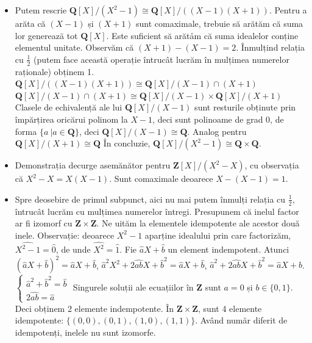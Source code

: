 \documentclass{article}
\begin{document}
\begin{itemize}
    \item Putem rescrie $\mathbf{Q}[X]/(X^2-1) \cong \mathbf{Q}[X]/((X-1)(X+1)).$ Pentru a arăta că $(X - 1)$ și $(X + 1)$ sunt comaximale, trebuie să arătăm că suma lor genereazä tot $\mathbf{Q}[X]$. Este suficient să arătåm că suma idealelor conține elementul unitate. \newline \newline
Observăm că $(X + 1) - (X - 1) = 2$. Înmulțind relația cu $\frac{1}{2}$ (putem face această operație întrucât lucrăm în mulțimea numerelor raționale) obținem 1. \newline \newline
$\mathbf{Q}[X]/((X-1)(X+1)) \cong \mathbf{Q}[X]/(X-1)\cap (X+1)$ \newline
$\mathbf{Q}[X]/(X-1)\cap (X+1) \cong \mathbf{Q}[X]/(X-1)\times \mathbf{Q}[X]/(X+1)$ \newline \newline
Clasele de echivalență ale lui $\mathbf{Q}[X]/(X-1)$ sunt resturile obținute prin împărțirea oricărui polinom la $X-1$, deci sunt polinoame de grad 0, de forma $\{a \ | a \in \mathbf{Q} \}$, deci $\mathbf{Q}[X]/(X-1)\cong \mathbf{Q}$. Analog pentru $\mathbf{Q}[X]/(X+1)\cong \mathbf{Q}$ \newline \newline
În concluzie, $\mathbf{Q}[X]/(X^2-1) \cong \mathbf{Q} \times \mathbf{Q}.$
\item Demonstrația decurge asemănător pentru $\mathbf{Z}[X]/(X^2-X)$, cu observația că $X^2-X = X(X-1)$. Sunt comaximale deoarece $X - (X-1) = 1$.
\item Spre deosebire de primul subpunct, aici nu mai putem înmulți relația cu $\frac{1}{2}$, întrucât lucrăm cu mulțimea numerelor întregi. \newline
Presupunem că inelul factor ar fi izomorf cu $\mathbf{Z} \times \mathbf{Z}$. Ne uităm la elementele idempotente ale acestor două inele.\newline
Observație: deoarece $X^2-1$ aparține idealului prin care factorizăm,
 $\widehat{X^2-1} = \widehat{0}$, de unde $\widehat{X^2} = \widehat{1}$. \newline
 Fie $\widehat{a}X + \widehat{b}$ un element indempotent. \newline
 Atunci $(\widehat{a}X + \widehat{b})^2 = \widehat{a}X + \widehat{b}$,  $\widehat{a}^2 X^2 + 2\widehat{ab}X + \widehat{b}^2 = \widehat{a}X + \widehat{b}$, $\widehat{a}^2 + 2\widehat{ab}X + \widehat{b}^2 = \widehat{a}X + \widehat{b}$. \newline \newline
 $\begin{cases} 
 \widehat{a}^2 +  \widehat{b}^2 = \widehat{b}\\ 
 2\widehat{ab} = \widehat{a}
 \end{cases}$
 Singurele soluții ale ecuațiilor în $\mathbf{Z}$ sunt $a = 0$ și $b \in \{0,1\}$. Deci obținem 2 elemente indempotente. \newline
 În $\mathbf{Z} \times \mathbf{Z}$, sunt 4 elemente idempotente: $\{(0,0), (0,1), (1, 0), (1, 1)\}$. Având număr diferit de idempotenți, inelele nu sunt izomorfe.
 

\end{itemize}
\end{document}
